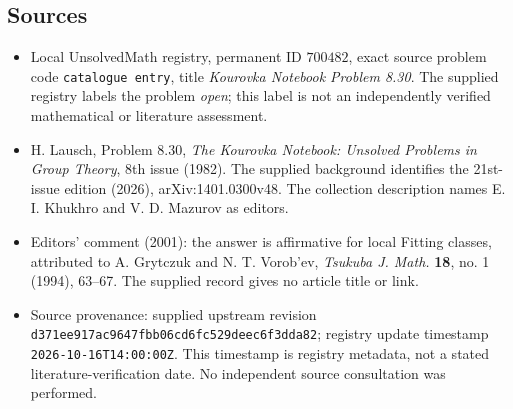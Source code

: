 \documentclass[11pt]{article}
\begin{document}
\subsection{Sources}
\begin{itemize}
\item Local UnsolvedMath registry, permanent ID \(700482\), exact source problem code \texttt{catalogue entry}, title \emph{Kourovka Notebook Problem 8.30}. The supplied registry labels the problem \emph{open}; this label is not an independently verified mathematical or literature assessment.
\item H. Lausch, Problem 8.30, \emph{The Kourovka Notebook: Unsolved Problems in Group Theory}, 8th issue (1982). The supplied background identifies the 21st-issue edition (2026), arXiv:1401.0300v48. The collection description names E. I. Khukhro and V. D. Mazurov as editors.
\item Editors' comment (2001): the answer is affirmative for local Fitting classes, attributed to A. Grytczuk and N. T. Vorob'ev, \emph{Tsukuba J. Math.} \textbf{18}, no. 1 (1994), 63--67. The supplied record gives no article title or link.
\item Source provenance: supplied upstream revision \texttt{d371ee917ac9647fbb06cd6fc529deec6f3dda82}; registry update timestamp \texttt{2026-10-16T14:00:00Z}. This timestamp is registry metadata, not a stated literature-verification date. No independent source consultation was performed.
\end{itemize}
\end{document}
